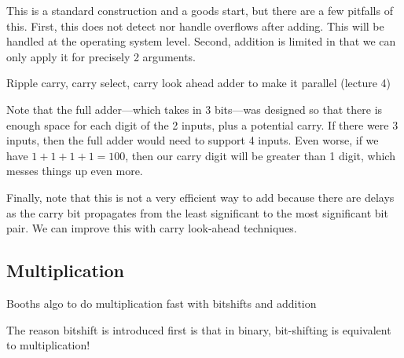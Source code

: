   \begin{corollary}
    \label{thm:implemention-for-n-bit-subtraction}
    
  \end{corollary}

  This is a standard construction and a goods start, but there are a few pitfalls of this. First, this does not detect nor handle overflows after adding. This will be handled at the operating system level. Second, addition is limited in that we can only apply it for precisely 2 arguments. 

  Ripple carry, carry select, carry look ahead adder to make it parallel (lecture 4)

  \begin{example}
    \label{ex:more-arguments-for-binary-addition}
    Note that the full adder---which takes in 3 bits---was designed so that there is enough space for each digit of the 2 inputs, plus a potential carry. If there were 3 inputs, then the full adder would need to support 4 inputs. Even worse, if we have $1 + 1 + 1 + 1 = 100$, then our carry digit will be greater than 1 digit, which messes things up even more. 
  \end{example}

  Finally, note that this is not a very efficient way to add because there are delays as the carry bit propagates from the least significant to the most significant bit pair. We can improve this with carry look-ahead techniques. 

\subsection{Multiplication} 

  Booths algo to do multiplication fast with bitshifts and addition 

  The reason bitshift is introduced first is that in binary, bit-shifting is equivalent to multiplication! 

  \begin{theorem}
    \label{thm:implementation-of-multiplication-in-circuits}
    
  \end{theorem}

  \begin{theorem}
    \label{thm:implementation-of-moving-data-in-circuits}
    
  \end{theorem}


